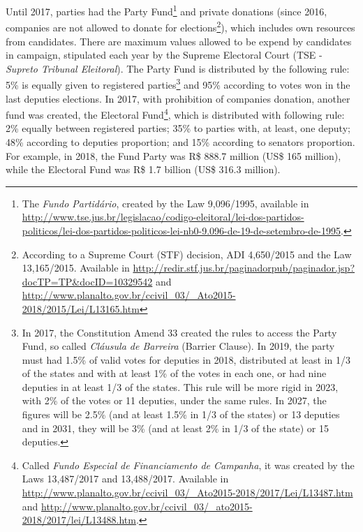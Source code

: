 \documentclass[
  12pt,
]{article}
\begin{document}
Until 2017, parties had the Party Fund\footnote{The \emph{Fundo
  Partidário}, created by the Law 9,096/1995, available in
  \url{http://www.tse.jus.br/legislacao/codigo-eleitoral/lei-dos-partidos-politicos/lei-dos-partidos-politicos-lei-nb0-9.096-de-19-de-setembro-de-1995}.}
and private donations (since 2016, companies are not allowed to donate
for elections\footnote{According to a Supreme Court (STF) decision, ADI
  4,650/2015 and the Law 13,165/2015. Available in
  \url{http://redir.stf.jus.br/paginadorpub/paginador.jsp?docTP=TP&docID=10329542}
  and
  \url{http://www.planalto.gov.br/ccivil_03/_Ato2015-2018/2015/Lei/L13165.htm}}),
which includes own resources from candidates. There are maximum values
allowed to be expend by candidates in campaign, stipulated each year by
the Supreme Electoral Court (TSE - \emph{Supreto Tribunal Eleitoral}).
The Party Fund is distributed by the following rule: 5\% is equally
given to registered parties\footnote{In 2017, the Constitution Amend 33
  created the rules to access the Party Fund, so called \emph{Cláusula
  de Barreira} (Barrier Clause). In 2019, the party must had 1.5\% of
  valid votes for deputies in 2018, distributed at least in 1/3 of the
  states and with at least 1\% of the votes in each one, or had nine
  deputies in at least 1/3 of the states. This rule will be more rigid
  in 2023, with 2\% of the votes or 11 deputies, under the same rules.
  In 2027, the figures will be 2.5\% (and at least 1.5\% in 1/3 of the
  states) or 13 deputies and in 2031, they will be 3\% (and at least 2\%
  in 1/3 of the state) or 15 deputies.} and 95\% according to votes won
in the last deputies elections. In 2017, with prohibition of companies
donation, another fund was created, the Electoral Fund\footnote{Called
  \emph{Fundo Especial de Financiamento de Campanha}, it was created by
  the Laws 13,487/2017 and 13,488/2017. Available in
  \url{http://www.planalto.gov.br/ccivil_03/_Ato2015-2018/2017/Lei/L13487.htm}
  and
  \url{http://www.planalto.gov.br/ccivil_03/_ato2015-2018/2017/lei/L13488.htm}.},
which is distributed with following rule: 2\% equally between registered
parties; 35\% to parties with, at least, one deputy; 48\% according to
deputies proportion; and 15\% according to senators proportion. For
example, in 2018, the Fund Party was R\$ 888.7 million (US\$ 165
million), while the Electoral Fund was R\$ 1.7 billion (US\$ 316.3
million).
\end{document}
